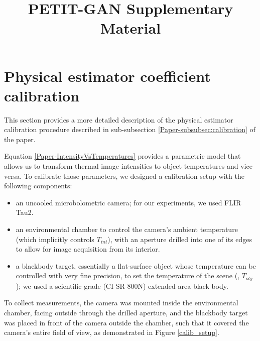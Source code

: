 \documentclass[10pt,twocolumn,letterpaper]{article}
\begin{document}
\setcounter{section}{5} %
\setcounter{equation}{15} 
\setcounter{figure}{4}

\title{PETIT-GAN Supplementary Material}
\maketitle


\section{Physical estimator coefficient calibration}
\label{sec:calibration}
This section provides a more detailed description of the physical estimator calibration procedure described in sub-subsection \ref{Paper-subsubsec:calibration} of the paper.

Equation \ref{Paper-IntensityVsTemperatures} provides a parametric model that allows us to transform thermal image intensities to object temperatures and vice versa.
To calibrate those parameters, we designed a calibration setup with the following components:
\begin{itemize}
  \item an uncooled microbolometric camera; for our experiments, we used FLIR Tau2.
  \item an environmental chamber to control the camera's ambient temperature (which implicitly controls $T_\mathit{int}$), with an aperture drilled into one of its edges to allow for image acquisition from its interior.
  \item a blackbody target, essentially a flat-surface object whose temperature can be controlled with very fine precision, to set the temperature of the scene (\ie, $T_\mathit{obj}$);
  we used a scientific grade (CI SR-800N) extended-area black body.
\end{itemize}
To collect measurements, the camera was mounted inside the environmental chamber, facing outside through the drilled aperture, and the blackbody target was placed in front of the camera outside the chamber, such that it covered the camera's entire field of view, as demonstrated in Figure \ref{calib_setup}.
\end{document}

